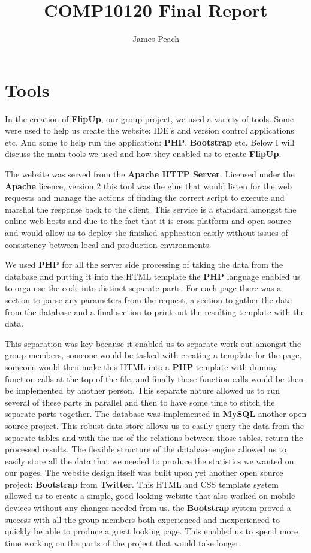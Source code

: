 \documentclass[11pt]{article}
\author{James Peach}
\begin{document}
\title{COMP10120 Final Report}
\renewcommand*\rmdefault{cmr}
\maketitle

\section{Tools}

In the creation of \textbf{FlipUp}, our group project, we used a variety of tools. Some were used to help us create the website: IDE's and version control applications etc. And some to help run the application: \textbf{PHP}, \textbf{Bootstrap} etc. Below I will discuss the main tools we used and how they enabled us to create \textbf{FlipUp}.

The website was served from the \textbf{Apache HTTP Server}. Licensed under the \textbf{Apache} licence, version 2 this tool was the glue that would listen for the web requests and manage the actions of finding the correct script to execute and marshal the response back to the client. This service is a standard amongst the online web-hosts and due to the fact that it is cross platform and open source and would allow us to deploy the finished application easily without issues of consistency between local and production environments.

We used \textbf{PHP} for all the server side processing of taking the data from the database and putting it into the HTML template the \textbf{PHP} language enabled us to organise the code into distinct separate parts. For each page there was a section to parse any parameters from the request, a section to gather the data from the database and a final section to print out the resulting template with the data.

This separation was key because it enabled us to separate work out amongst the group members, someone would be tasked with creating a template for the page, someone would then make this HTML into a \textbf{PHP} template with dummy function calls at the top of the file, and finally those function calls would be then be implemented by another person. This separate nature allowed us to run several of these parts in parallel and then to have some time to stitch the separate parts together.
The database was implemented in \textbf{MySQL} another open source project. This robust data store allows us to easily query the data from the separate tables and with the use of the relations between those tables, return the processed results. The flexible structure of the database engine allowed us to easily store all the data that we needed to produce the statistics we wanted on our pages.
The website design itself was built upon yet another open source project: \textbf{Bootstrap} from \textbf{Twitter}. This HTML and CSS template system allowed us to create a simple, good looking website that also worked on mobile devices without any changes needed from us. the \textbf{Bootstrap} system proved a success with all the group members both experienced and inexperienced to quickly be able to produce a great looking page. This enabled us to spend more time working on the parts of the project that would take longer.
\end{document}
